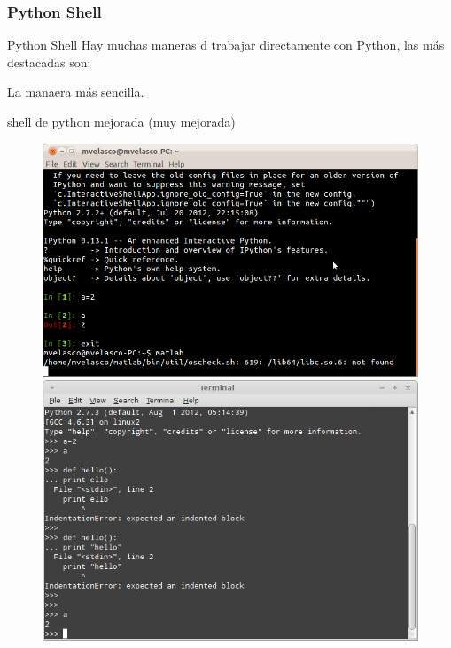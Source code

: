 \documentclass[10pt,colorlinks]{beamer}
\begin{document}
\begin{frame}[fragile]\frametitle{Python Shell}
        \begin{block}{\centering Python Shell}
\small Hay muchas maneras d trabajar directamente con Python, las más destacadas son: 
    \begin{description}
\scriptsize    
        \item[CLIPython] La manaera más sencilla.
        \item[IPython] shell de python mejorada (muy mejorada)
    \end{description}
\end{block}
\begin{figure}
\begin{minipage}[b]{0.45\linewidth}
\centering
\includegraphics[width=\textwidth]{figs/commandline.jpg}
\end{minipage}
\hspace{0.5cm}
\begin{minipage}[b]{0.45\linewidth}
\centering
\includegraphics[width=\textwidth]{figs/commandline2.jpg}
\end{minipage}
\end{figure}    
\end{frame}
\end{document}
